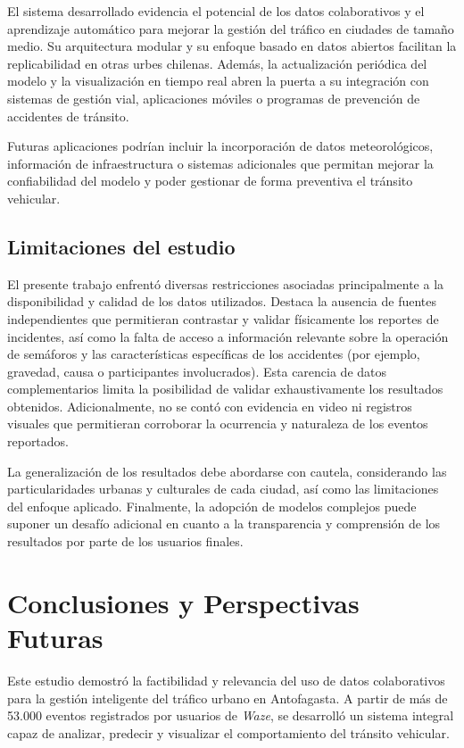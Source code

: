 \documentclass[12pt]{article}
\begin{document}
El sistema desarrollado evidencia el potencial de los datos colaborativos y el aprendizaje automático para mejorar la gestión del tráfico en ciudades de tamaño medio. Su arquitectura modular y su enfoque basado en datos abiertos facilitan la replicabilidad en otras urbes chilenas. Además, la actualización periódica del modelo y la visualización en tiempo real abren la puerta a su integración con sistemas de gestión vial, aplicaciones móviles o programas de prevención de accidentes de tránsito.

Futuras aplicaciones podrían incluir la incorporación de datos meteorológicos, información de infraestructura o sistemas adicionales que permitan mejorar la confiabilidad del modelo y poder gestionar de forma preventiva el tránsito vehicular.

\subsection{Limitaciones del estudio}

El presente trabajo enfrentó diversas restricciones asociadas principalmente a la disponibilidad y calidad de los datos utilizados. Destaca la ausencia de fuentes independientes que permitieran contrastar y validar físicamente los reportes de incidentes, así como la falta de acceso a información relevante sobre la operación de semáforos y las características específicas de los accidentes (por ejemplo, gravedad, causa o participantes involucrados). Esta carencia de datos complementarios limita la posibilidad de validar exhaustivamente los resultados obtenidos. Adicionalmente, no se contó con evidencia en video ni registros visuales que permitieran corroborar la ocurrencia y naturaleza de los eventos reportados.

La generalización de los resultados debe abordarse con cautela, considerando las particularidades urbanas y culturales de cada ciudad, así como las limitaciones del enfoque aplicado. Finalmente, la adopción de modelos complejos puede suponer un desafío adicional en cuanto a la transparencia y comprensión de los resultados por parte de los usuarios finales.

\section{Conclusiones y Perspectivas Futuras}

Este estudio demostró la factibilidad y relevancia del uso de datos colaborativos para la gestión inteligente del tráfico urbano en Antofagasta. A partir de más de 53.000 eventos registrados por usuarios de \textit{Waze}, se desarrolló un sistema integral capaz de analizar, predecir y visualizar el comportamiento del tránsito vehicular.
\end{document}
